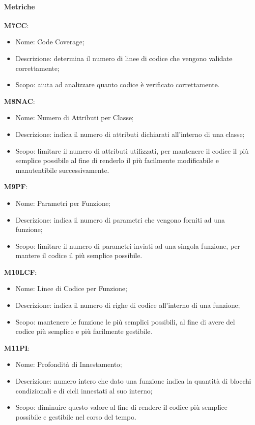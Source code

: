     \paragraph{Metriche}\hfill \break
    \textbf{M7CC}:
    \begin{itemize}
      \item Nome: Code Coverage;
      \item Descrizione: determina il numero di linee di codice che vengono validate correttamente;
      \item Scopo: aiuta ad analizzare quanto codice è verificato correttamente.
    \end{itemize}
    \textbf{M8NAC}:
    \begin{itemize}
      \item Nome: Numero di Attributi per Classe;
      \item Descrizione: indica il numero di attributi dichiarati all'interno di una classe;
      \item Scopo: limitare il numero di attributi utilizzati, per mantenere il codice il più semplice possibile al fine di renderlo il più facilmente modificabile e manutentibile successivamente.
    \end{itemize} 
    \textbf{M9PF}:
    \begin{itemize}
      \item Nome: Parametri per Funzione;
      \item Descrizione: indica il numero di parametri che vengono forniti ad una funzione;
      \item Scopo: limitare il numero di parametri inviati ad una singola funzione, per mantere il codice il più semplice possibile.
    \end{itemize}
    \textbf{M10LCF}:
    \begin{itemize}
      \item Nome: Linee di Codice per Funzione;
      \item Descrizione: indica il numero di righe di codice all'interno di una funzione;
      \item Scopo: mantenere le funzione le più semplici possibili, al fine di avere del codice più semplice e più facilmente gestibile.
    \end{itemize}    
    \textbf{M11PI}:
    \begin{itemize}
      \item Nome: Profondità di Innestamento;
      \item Descrizione: numero intero che dato una funzione indica la quantità di blocchi condizionali e di cicli innestati al suo interno;
      \item Scopo: diminuire questo valore al fine di rendere il codice più semplice possibile e gestibile nel corso del tempo.
    \end{itemize}
